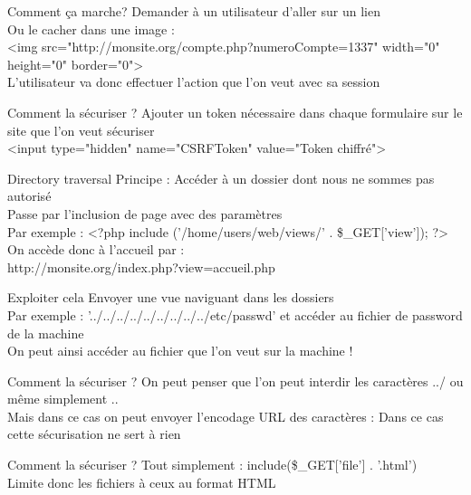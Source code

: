 \documentclass{beamer}
\begin{document}
\begin{frame}{Comment ça marche?}
	Demander à un utilisateur d'aller sur un lien\\
	Ou le cacher dans une image :\\
	<img src="http://monsite.org/compte.php?numeroCompte=1337" width="0" height="0" border="0">\\
	L'utilisateur va donc effectuer l'action que l'on veut avec sa session
\end{frame}

\begin{frame}{Comment la sécuriser ?}
	Ajouter un token nécessaire dans chaque formulaire sur le site que l'on veut sécuriser\\
	<input type="hidden" name="CSRFToken" value="Token chiffré">
\end{frame}

\begin{frame}{Directory traversal}
	Principe : Accéder à un dossier dont nous ne sommes pas autorisé\\
	Passe par l'inclusion de page avec des paramètres\\
	Par exemple : <?php include ('/home/users/web/views/' . \$\_GET['view']); ?>\\
	On accède donc à l'accueil par : \\
	http://monsite.org/index.php?view=accueil.php
\end{frame}

\begin{frame}{Exploiter cela}
	Envoyer une vue naviguant dans les dossiers\\
	Par exemple : '../../../../../../../../../etc/passwd' et accéder au fichier de password de la machine\\
	On peut ainsi accéder au fichier que l'on veut sur la machine !
\end{frame}

\begin{frame}{Comment la sécuriser ?}
	On peut penser que l'on peut interdir les caractères ../ ou même simplement ..\\
	Mais dans ce cas on peut envoyer l'encodage URL des caractères : %
	Dans ce cas cette sécurisation ne sert à rien
\end{frame}

\begin{frame}{Comment la sécuriser ?}
	Tout simplement : include(\$\_GET['file'] . '.html')\\
	Limite donc les fichiers à ceux au format HTML
\end{frame}
\end{document}
